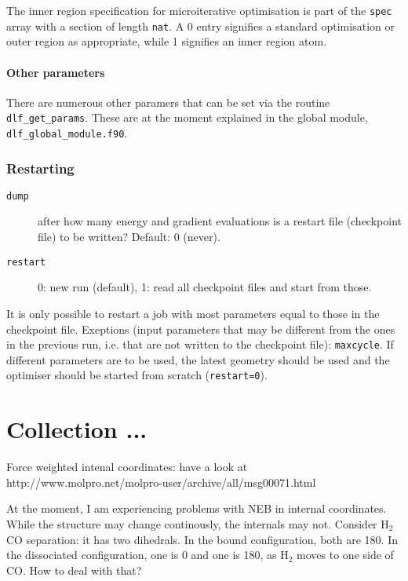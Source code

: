 \documentclass{article}
\begin{document}
The inner region specification for microiterative optimisation is 
part of the \texttt{spec} array with a section of length \texttt{nat}. A 0 entry signifies 
a standard optimisation or outer region as appropriate, while 1 signifies 
an inner region atom.

\paragraph{Other parameters}
There are numerous other paramers that can be set via the routine
\texttt{dlf\_get\_params}. These are at the moment explained in the global
module, \texttt{dlf\_global\_module.f90}.

\subsubsection{Restarting}

\begin{description}
\item[\texttt{dump}] after how many energy and gradient evaluations is a
  restart file (checkpoint file) to be written? Default: 0 (never).
\item[\texttt{restart}] 0: new run (default), 1: read all checkpoint files and start
  from those.
\end{description}

It is only possible to restart a job with most parameters equal to those in
the checkpoint file. Exeptions (input parameters that may be different from
the ones in the previous run, i.e. that are not written to the checkpoint
file): \texttt{maxcycle}. If different parameters are to be used, the latest
geometry should be used and the optimiser should be started from scratch
(\texttt{restart=0}).

\section{Collection ...}

Force weighted intenal coordinates: have a look at
http://www.molpro.net/molpro-user/archive/all/msg00071.html

At the moment, I am experiencing problems with NEB in internal coordinates.
While the structure may change continously, the internals may not. Consider
H$_2$CO separation: it has two dihedrals. In the bound configuration, both are
180\textdegree{}. In the dissociated configuration, one is 0 and one is 180,
as H$_2$ moves to one side of CO. How to deal with that? 
\end{document}
